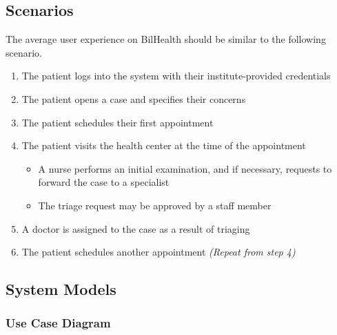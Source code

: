 \documentclass[a4paper, 12pt, titlepage]{article}
\begin{document}
  \pagebreak
  \subsection{Scenarios}

  The average user experience on BilHealth should be similar to the following scenario.

  \begin{enumerate}
    \item The patient logs into the system with their institute-provided credentials
    \item The patient opens a case and specifies their concerns
    \item The patient schedules their first appointment
    \item The patient visits the health center at the time of the appointment
    \begin{itemize}
      \item A nurse performs an initial examination, and if necessary, requests to forward the case to a specialist
      \item The triage request may be approved by a staff member
    \end{itemize}
    \item A doctor is assigned to the case as a result of triaging
    \item The patient schedules another appointment \textit{(Repeat from step 4)}
  \end{enumerate}

  \pagebreak
  \subsection{System Models}

  \subsubsection{Use Case Diagram}
\end{document}
